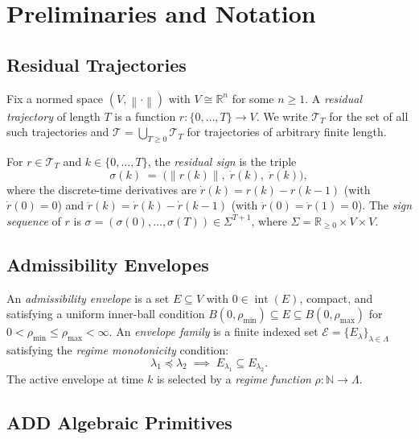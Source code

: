 \documentclass[11pt,a4paper]{article}
\theoremstyle{plain}
\theoremstyle{definition}
\theoremstyle{remark}
\DeclareMathOperator{\interior}{int}
\newcommand{\R}{\mathbb{R}}
\newcommand{\N}{\mathbb{N}}
\newcommand{\norm}[1]{\left\|#1\right\|}
\begin{document}
\section{Preliminaries and Notation}
\label{sec:prelim}

\subsection{Residual Trajectories}

Fix a normed space $(V, \norm{\cdot})$ with $V \cong \R^n$ for some $n \geq 1$. A
\emph{residual trajectory} of length $T$ is a function $r : \{0, \ldots, T\} \to V$.
We write $\mathcal{T}_T$ for the set of all such trajectories and $\mathcal{T} = \bigcup_{T \geq 0}
\mathcal{T}_T$ for trajectories of arbitrary finite length.

For $r \in \mathcal{T}_T$ and $k \in \{0,\ldots,T\}$, the \emph{residual sign} is the triple
\begin{equation}
  \sigma(k) \;=\; \bigl(\norm{r(k)},\; \dot{r}(k),\; \ddot{r}(k)\bigr),
\end{equation}
where the discrete-time derivatives are $\dot{r}(k) = r(k) - r(k-1)$ (with $\dot{r}(0) = 0$) and
$\ddot{r}(k) = \dot{r}(k) - \dot{r}(k-1)$ (with $\ddot{r}(0) = \ddot{r}(1) = 0$). The
\emph{sign sequence} of $r$ is $\sigma = (\sigma(0), \ldots, \sigma(T)) \in \Sigma^{T+1}$, where
$\Sigma = \R_{\geq 0} \times V \times V$.

\subsection{Admissibility Envelopes}

An \emph{admissibility envelope} is a set $E \subseteq V$ with $0 \in \interior(E)$, compact, and
satisfying a uniform inner-ball condition $B(0, \rho_{\min}) \subseteq E \subseteq B(0, \rho_{\max})$
for $0 < \rho_{\min} \leq \rho_{\max} < \infty$. An \emph{envelope family} is a finite indexed
set $\mathcal{E} = \{E_\lambda\}_{\lambda \in \Lambda}$ satisfying the \emph{regime monotonicity}
condition:
\begin{equation}
  \lambda_1 \preceq \lambda_2 \;\implies\; E_{\lambda_1} \subseteq E_{\lambda_2}.
\end{equation}
The active envelope at time $k$ is selected by a \emph{regime function} $\rho : \N \to \Lambda$.

\subsection{ADD Algebraic Primitives}
\end{document}
